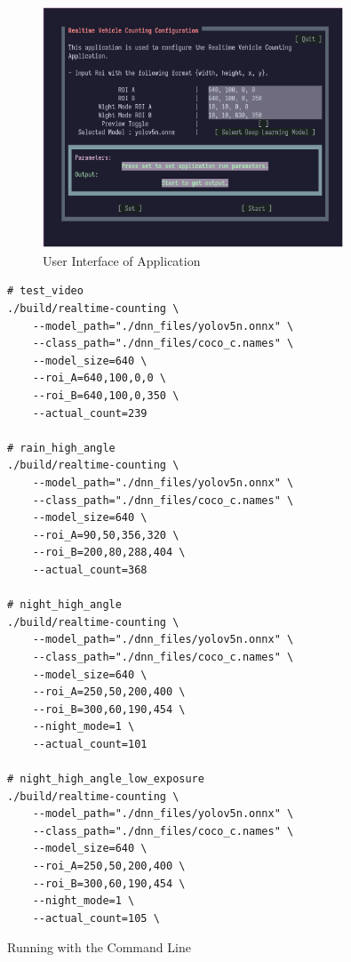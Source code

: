 \documentclass[12pt,a4paper,fleqn]{report}
\begin{document}
\begin{figure}[htbp]
    \begin{center}
        \includegraphics[width=0.8\textwidth]{figures/rvc-tui.png}
    \end{center}
    \caption{User Interface of Application}
    \label{fig:rvc-tui}
\end{figure}



\begin{listing}[htbp]
\begin{verbatim}
# test_video
./build/realtime-counting \
    --model_path="./dnn_files/yolov5n.onnx" \
    --class_path="./dnn_files/coco_c.names" \
    --model_size=640 \
    --roi_A=640,100,0,0 \
    --roi_B=640,100,0,350 \
    --actual_count=239

# rain_high_angle
./build/realtime-counting \
    --model_path="./dnn_files/yolov5n.onnx" \
    --class_path="./dnn_files/coco_c.names" \
    --model_size=640 \
    --roi_A=90,50,356,320 \
    --roi_B=200,80,288,404 \
    --actual_count=368

# night_high_angle
./build/realtime-counting \
    --model_path="./dnn_files/yolov5n.onnx" \
    --class_path="./dnn_files/coco_c.names" \
    --model_size=640 \
    --roi_A=250,50,200,400 \
    --roi_B=300,60,190,454 \
    --night_mode=1 \
    --actual_count=101

# night_high_angle_low_exposure
./build/realtime-counting \
    --model_path="./dnn_files/yolov5n.onnx" \
    --class_path="./dnn_files/coco_c.names" \
    --model_size=640 \
    --roi_A=250,50,200,400 \
    --roi_B=300,60,190,454 \
    --night_mode=1 \
    --actual_count=105 \

\end{verbatim}
\caption{Running with the Command Line}
\label{lst:clrun}
\end{listing}
\end{document}
